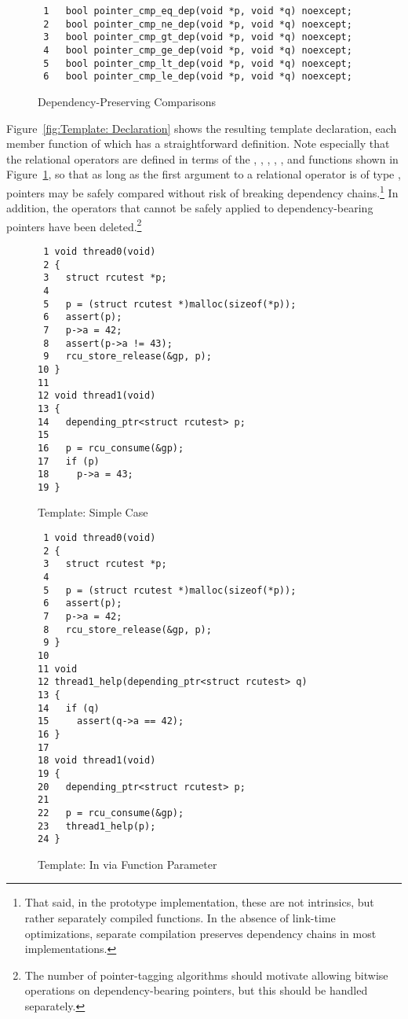\begin{figure}[tbp]
{ \scriptsize
\begin{verbatim}
 1   bool pointer_cmp_eq_dep(void *p, void *q) noexcept;
 2   bool pointer_cmp_ne_dep(void *p, void *q) noexcept;
 3   bool pointer_cmp_gt_dep(void *p, void *q) noexcept;
 4   bool pointer_cmp_ge_dep(void *p, void *q) noexcept;
 5   bool pointer_cmp_lt_dep(void *p, void *q) noexcept;
 6   bool pointer_cmp_le_dep(void *p, void *q) noexcept;
\end{verbatim}
}
\caption{Dependency-Preserving Comparisons}
\label{fig:Dependency-Preserving Comparisons}
\end{figure}

Figure~\ref{fig:Template: Declaration}
shows the resulting template declaration, each member function of which
has a straightforward definition.
Note especially that the relational operators are defined in terms of the
,
,
,
,
, and
functions shown in
Figure~\ref{fig:Dependency-Preserving Comparisons},
so that as long as the first argument to a relational operator is of type
,
pointers may be safely compared without risk of breaking dependency
chains.\footnote{
	That said, in the prototype implementation,
	these are not intrinsics, but rather separately compiled functions.
	In the absence of link-time optimizations, separate compilation
	preserves dependency chains in most implementations.}
In addition, the operators that cannot be safely applied to
dependency-bearing pointers have been deleted.\footnote{
	The number of pointer-tagging algorithms should motivate
	allowing bitwise operations on dependency-bearing
	pointers, but this should be handled separately.}

\begin{figure}[tbp]
{ \scriptsize
\begin{verbatim}
 1 void thread0(void)
 2 {
 3   struct rcutest *p;
 4
 5   p = (struct rcutest *)malloc(sizeof(*p));
 6   assert(p);
 7   p->a = 42;
 8   assert(p->a != 43);
 9   rcu_store_release(&gp, p);
10 }
11
12 void thread1(void)
13 {
14   depending_ptr<struct rcutest> p;
15
16   p = rcu_consume(&gp);
17   if (p)
18     p->a = 43;
19 }
\end{verbatim}
}
\caption{Template: Simple Case}
\label{fig:Template: Simple Case}
\end{figure}

\begin{figure}[tbp]
{ \scriptsize
\begin{verbatim}
 1 void thread0(void)
 2 {
 3   struct rcutest *p;
 4
 5   p = (struct rcutest *)malloc(sizeof(*p));
 6   assert(p);
 7   p->a = 42;
 8   rcu_store_release(&gp, p);
 9 }
10
11 void
12 thread1_help(depending_ptr<struct rcutest> q)
13 {
14   if (q)
15     assert(q->a == 42);
16 }
17
18 void thread1(void)
19 {
20   depending_ptr<struct rcutest> p;
21
22   p = rcu_consume(&gp);
23   thread1_help(p);
24 }
\end{verbatim}
}
\caption{Template: In via Function Parameter}
\label{fig:Template: In via Function Parameter}
\end{figure}

